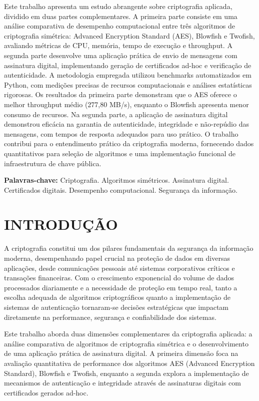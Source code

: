 \documentclass[12pt,a4paper,oneside]{article}
\begin{document}
Este trabalho apresenta um estudo abrangente sobre criptografia aplicada, dividido em duas partes complementares. A primeira parte consiste em uma análise comparativa de desempenho computacional entre três algoritmos de criptografia simétrica: Advanced Encryption Standard (AES), Blowfish e Twofish, avaliando métricas de CPU, memória, tempo de execução e throughput. A segunda parte desenvolve uma aplicação prática de envio de mensagens com assinatura digital, implementando geração de certificados ad-hoc e verificação de autenticidade. A metodologia empregada utilizou benchmarks automatizados em Python, com medições precisas de recursos computacionais e análises estatísticas rigorosas. Os resultados da primeira parte demonstram que o AES oferece o melhor throughput médio (277,80 MB/s), enquanto o Blowfish apresenta menor consumo de recursos. Na segunda parte, a aplicação de assinatura digital demonstrou eficácia na garantia de autenticidade, integridade e não-repúdio das mensagens, com tempos de resposta adequados para uso prático. O trabalho contribui para o entendimento prático da criptografia moderna, fornecendo dados quantitativos para seleção de algoritmos e uma implementação funcional de infraestrutura de chave pública.

\vspace{0.5cm}
\noindent\textbf{Palavras-chave:} Criptografia. Algoritmos simétricos. Assinatura digital. Certificados digitais. Desempenho computacional. Segurança da informação.

\newpage
\tableofcontents

\newpage
\section{INTRODUÇÃO}

A criptografia constitui um dos pilares fundamentais da segurança da informação moderna, desempenhando papel crucial na proteção de dados em diversas aplicações, desde comunicações pessoais até sistemas corporativos críticos e transações financeiras. Com o crescimento exponencial do volume de dados processados diariamente e a necessidade de proteção em tempo real, tanto a escolha adequada de algoritmos criptográficos quanto a implementação de sistemas de autenticação tornaram-se decisões estratégicas que impactam diretamente na performance, segurança e confiabilidade dos sistemas.

Este trabalho aborda duas dimensões complementares da criptografia aplicada: a análise comparativa de algoritmos de criptografia simétrica e o desenvolvimento de uma aplicação prática de assinatura digital. A primeira dimensão foca na avaliação quantitativa de performance dos algoritmos AES (Advanced Encryption Standard), Blowfish e Twofish, enquanto a segunda explora a implementação de mecanismos de autenticação e integridade através de assinaturas digitais com certificados gerados ad-hoc.
\end{document}

